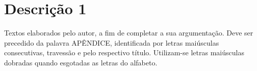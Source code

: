 \chapter{Descrição 1}\label{apendice:a}

Textos elaborados pelo autor, a fim de completar a sua argumentação. Deve ser precedido da palavra APÊNDICE, identificada por letras maiúsculas consecutivas, travessão e pelo respectivo título. Utilizam-se letras maiúsculas dobradas quando esgotadas as letras do alfabeto. 
